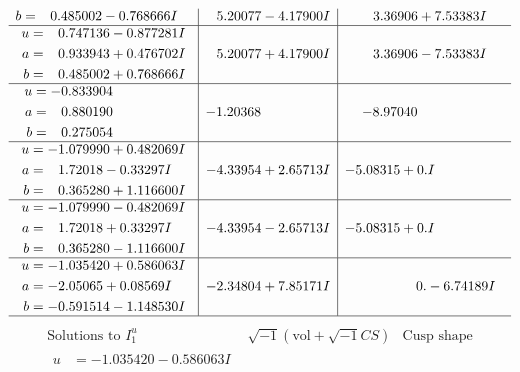 \documentclass[1p]{elsarticle_modified}
\theoremstyle{definition}
\newcommand{\I}{\sqrt{-1}}
\begin{document}
$$\begin{array}{c|c|c}
\begin{aligned}
b &= \phantom{-}0.485002 - 0.768666 I\end{aligned}
 & \phantom{-}5.20077 - 4.17900 I & \phantom{-}3.36906 + 7.53383 I \\ \hline\begin{aligned}
u &= \phantom{-}0.747136 - 0.877281 I \\
a &= \phantom{-}0.933943 + 0.476702 I \\
b &= \phantom{-}0.485002 + 0.768666 I\end{aligned}
 & \phantom{-}5.20077 + 4.17900 I & \phantom{-}3.36906 - 7.53383 I \\ \hline\begin{aligned}
u &= -0.833904\phantom{ +0.000000I} \\
a &= \phantom{-}0.880190\phantom{ +0.000000I} \\
b &= \phantom{-}0.275054\phantom{ +0.000000I}\end{aligned}
 & -1.20368\phantom{ +0.000000I} & -8.97040\phantom{ +0.000000I} \\ \hline\begin{aligned}
u &= -1.079990 + 0.482069 I \\
a &= \phantom{-}1.72018 - 0.33297 I \\
b &= \phantom{-}0.365280 + 1.116600 I\end{aligned}
 & -4.33954 + 2.65713 I & -5.08315 + 0. I\phantom{ +0.000000I} \\ \hline\begin{aligned}
u &= -1.079990 - 0.482069 I \\
a &= \phantom{-}1.72018 + 0.33297 I \\
b &= \phantom{-}0.365280 - 1.116600 I\end{aligned}
 & -4.33954 - 2.65713 I & -5.08315 + 0. I\phantom{ +0.000000I} \\ \hline\begin{aligned}
u &= -1.035420 + 0.586063 I \\
a &= -2.05065 + 0.08569 I \\
b &= -0.591514 - 1.148530 I\end{aligned}
 & -2.34804 + 7.85171 I & \phantom{-0.000000 } 0. - 6.74189 I\\
 \hline 
 \end{array}$$\newpage$$\begin{array}{c|c|c}  
\text{Solutions to }I^u_{1}& \I (\text{vol} + \sqrt{-1}CS) & \text{Cusp shape}\\
 \hline 
\begin{aligned}
u &= -1.035420 - 0.586063 I \\

\end{aligned}
\end{array}$$
\end{document}
